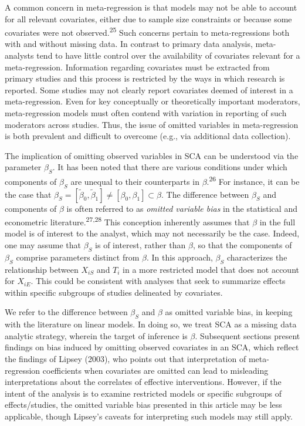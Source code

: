 \documentclass[
]{article}
\begin{document}
A common concern in meta-regression is that models may not be able to account for all relevant covariates, either due to sample size constraints or because some covariates were not observed.\textsuperscript{25}
Such concerns pertain to meta-regressions both with and without missing data.
In contrast to primary data analysis, meta-analysts tend to have little control over the availability of covariates relevant for a meta-regression.
Information regarding covariates must be extracted from primary studies and this process is restricted by the ways in which research is reported.
Some studies may not clearly report covariates deemed of interest in a meta-regression.
Even for key conceptually or theoretically important moderators, meta-regression models must often contend with variation in reporting of such moderators across studies.
Thus, the issue of omitted variables in meta-regression is both prevalent and difficult to overcome (e.g., via additional data collection).

The implication of omitting observed variables in SCA can be understood via the parameter \(\beta_S\).
It has been noted that there are various conditions under which components of \(\beta_S\) are unequal to their counterparts in \(\beta\).\textsuperscript{26}
For instance, it can be the case that \(\beta_S = [\tilde{\beta}_0, \tilde{\beta}_1] \neq [\beta_0, \beta_1] \subset \beta\).
The difference between \(\beta_S\) and components of \(\beta\) is often referred to as \emph{omitted variable bias} in the statistical and econometric literature.\textsuperscript{27,28}
This conception inherently assumes that \(\beta\) in the full model is of interest to the analyst, which may not necessarily be the case.
Indeed, one may assume that \(\beta_S\) is of interest, rather than \(\beta\), so that the components of \(\beta_S\) comprise parameters distinct from \(\beta\).
In this approach, \(\beta_S\) characterizes the relationship between \(X_{iS}\) and \(T_i\) in a more restricted model that does not account for \(X_{iE}\).
This could be consistent with analyses that seek to summarize effects within specific subgroups of studies delineated by covariates.

We refer to the difference between \(\beta_S\) and \(\beta\) as omitted variable bias, in keeping with the literature on linear models.
In doing so, we treat SCA as a missing data analytic strategy, wherein the target of inference is \(\beta\).
Subsequent sections present findings on bias induced by omitting observed covariates in an SCA, which reflect the findings of Lipsey (2003), who points out that interpretation of meta-regression coefficients when covariates are omitted can lead to misleading interpretations about the correlates of effective interventions.
However, if the intent of the analysis is to examine restricted models or specific subgroups of effects/studies, the omitted variable bias presented in this article may be less applicable, though Lipsey's caveats for interpreting such models may still apply.
\end{document}
